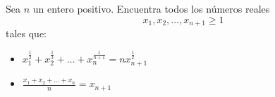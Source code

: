 Sea $n$ un entero positivo. Encuentra todos los números reales 
\[x_1, x_2, \dots, x_{n+1} \geq 1\]
tales que:
 \begin{itemize} 
 \item $x_1^{\frac{1}{2}}+x_2^{\frac{1}{3}}+\dots+x_n^{\frac{1}{n+1}}=nx_{n+1}^\frac{1}{2}$
 \item $\frac{x_1+x_2+\dots+x_n}{n}=x_{n+1}$
 \end{itemize} 